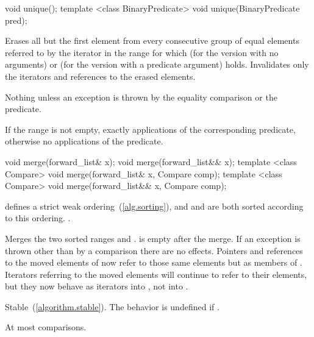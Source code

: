 %
%
\begin{itemdecl}
void unique();
template <class BinaryPredicate> void unique(BinaryPredicate pred);
\end{itemdecl}

\begin{itemdescr}
\pnum
\effects Erases all but the first element from every consecutive
group of equal elements referred to by the iterator  in the range  for which  (for the version with no arguments) or  (for the version with a predicate argument) holds.
Invalidates only the iterators and references to the erased elements.

\pnum
\throws Nothing unless an exception is thrown by the equality comparison or the predicate.

\pnum
\complexity If the range  is not empty, exactly  applications of the corresponding predicate, otherwise no applications of the predicate.
\end{itemdescr}

%
%
\begin{itemdecl}
void merge(forward_list& x);
void merge(forward_list&& x);
template <class Compare> void merge(forward_list& x, Compare comp);
template <class Compare> void merge(forward_list&& x, Compare comp);
\end{itemdecl}

\begin{itemdescr}
\pnum
\requires {} defines a strict weak ordering~(\ref{alg.sorting}), and 
and  are both sorted according to this ordering.
.

\pnum
\effects Merges the two sorted ranges \tcode{[begin(), end())} and
\tcode{[x.begin(), x.end())}.  is empty after the merge. If an
exception is thrown other than by a comparison there are no effects.
Pointers and references to the moved elements of  now refer to those same elements
but as members of . Iterators referring to the moved elements will continue to
refer to their elements, but they now behave as iterators into , not into
.

\pnum
\remarks Stable~(\ref{algorithm.stable}). The behavior is undefined if
.

\pnum
\complexity At most  comparisons.
\end{itemdescr}

